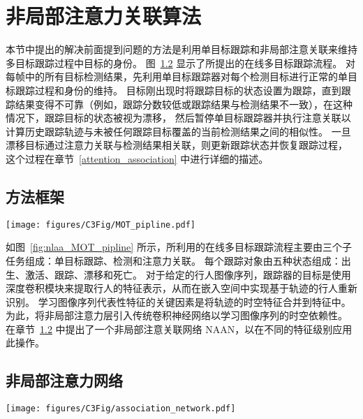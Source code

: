 \section{非局部注意力关联算法}
本节中提出的解决前面提到问题的方法是利用单目标跟踪和非局部注意关联来维持多目标跟踪过程中目标的身份。
图~\ref{nonlocal_attention_network} 显示了所提出的在线多目标跟踪流程。
对每帧中的所有目标检测结果，先利用单目标跟踪器对每个检测目标进行正常的单目标跟踪过程和身份的维持。
目标刚出现时将跟踪目标的状态设置为跟踪，直到跟踪结果变得不可靠（例如，跟踪分数较低或跟踪结果与检测结果不一致），在这种情况下，跟踪目标的状态被视为漂移，
然后暂停单目标跟踪器并执行注意关联以计算历史跟踪轨迹与未被任何跟踪目标覆盖的当前检测结果之间的相似性。
一旦漂移目标通过注意力关联与检测结果相关联，则更新跟踪状态并恢复跟踪过程，
这个过程在章节~\ref{attention_association} 中进行详细的描述。



\subsection{方法框架}

\begin{figure*}[ht]
	\centering
	\texttt{[image: figures/C3Fig/MOT\_pipline.pdf]}
	\caption{在线多目标跟踪流程}
	\label{fig:nlaa_MOT_pipline}
\end{figure*}


如图~\ref{fig:nlaa_MOT_pipline} 所示，所利用的在线多目标跟踪流程主要由三个子任务组成：单目标跟踪、检测和注意力关联。 
每个跟踪对象由五种状态组成：出生、激活、跟踪、漂移和死亡。
对于给定的行人图像序列，跟踪器的目标是使用深度卷积模块来提取行人的特征表示，从而在嵌入空间中实现基于轨迹的行人重新识别。 
学习图像序列代表性特征的关键因素是将轨迹的时空特征合并到特征中。 
为此，将非局部注意力层引入传统卷积神经网络以学习图像序列的时空依赖性。 
在章节~\ref{nonlocal_attention_network} 中提出了一个非局部注意关联网络 NAAN，以在不同的特征级别应用此操作。

\subsection{非局部注意力网络} \label{nonlocal_attention_network}

\begin{figure*}[ht]
	\centering
	\texttt{[image: figures/C3Fig/association\_network.pdf]}
	\caption{NAAN 中的注意力关联模块概述}
	\label{fig:nlaa_association_network}
\end{figure*}

